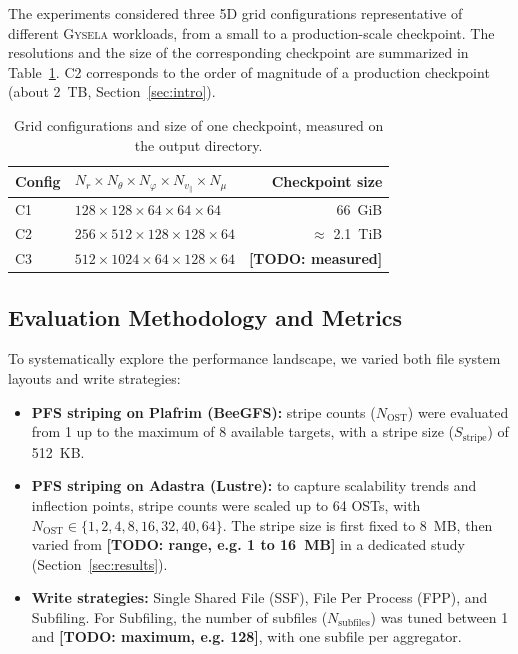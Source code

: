 The experiments considered three 5D grid configurations representative of different
\textsc{Gysela} workloads, from a small to a production-scale checkpoint. The resolutions and the
size of the corresponding checkpoint are summarized in Table~\ref{tab:configs}. C2 corresponds to
the order of magnitude of a production checkpoint (about 2~TB, Section~\ref{sec:intro}).

\begin{table}[h]
  \centering
  \caption{Grid configurations and size of one checkpoint, measured on the output directory.}
  \label{tab:configs}
  \begin{tabular}{llr}
    \hline
    Config & $N_r \times N_\theta \times N_\varphi \times N_{v_\parallel} \times N_\mu$ & Checkpoint size \\
    \hline
    C1 & $128 \times 128 \times 64 \times 64 \times 64$ & 66~GiB \\
    C2 & $256 \times 512 \times 128 \times 128 \times 64$ & $\approx$ 2.1~TiB \\
    C3 & $512 \times 1024 \times 64 \times 128 \times 64$ & \textbf{[TODO: measured]} \\
    \hline
  \end{tabular}
\end{table}

\subsection{Evaluation Methodology and Metrics}
\label{sec:methodology}

To systematically explore the performance landscape, we varied both file system layouts and
write strategies:
\begin{itemize}
  \item \textbf{PFS striping on Plafrim (BeeGFS):} stripe counts ($N_{\text{OST}}$) were evaluated
        from 1 up to the maximum of 8 available targets, with a stripe size ($S_{\text{stripe}}$)
        of 512~KB.
  \item \textbf{PFS striping on Adastra (Lustre):} to capture scalability trends and inflection
        points, stripe counts were scaled up to 64 OSTs, with $N_{\text{OST}} \in \{1, 2, 4, 8, 16,
        32, 40, 64\}$. The stripe size is first fixed to 8~MB, then varied from
        \textbf{[TODO: range, e.g. 1 to 16~MB]} in a dedicated study (Section~\ref{sec:results}).
  \item \textbf{Write strategies:} Single Shared File (SSF), File Per Process (FPP), and Subfiling.
        For Subfiling, the number of subfiles ($N_{\text{subfiles}}$) was tuned between 1 and
        \textbf{[TODO: maximum, e.g. 128]}, with one subfile per aggregator.
\end{itemize}

